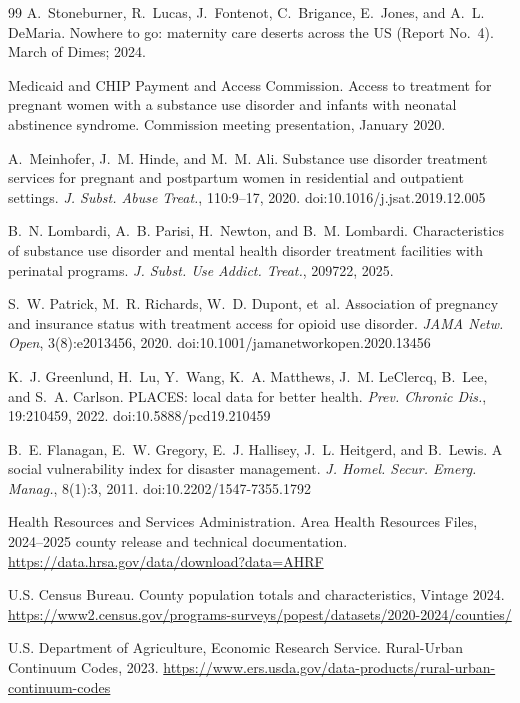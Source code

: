 \documentclass[10pt,twocolumn,letterpaper]{article}
\begin{document}
\begin{thebibliography}{99}
 A.~Stoneburner, R.~Lucas, J.~Fontenot, C.~Brigance, E.~Jones, and A.~L. DeMaria. Nowhere to go: maternity care deserts across the US (Report No.~4). March of Dimes; 2024.

 Medicaid and CHIP Payment and Access Commission. Access to treatment for pregnant women with a substance use disorder and infants with neonatal abstinence syndrome. Commission meeting presentation, January 2020.

 A.~Meinhofer, J.~M. Hinde, and M.~M. Ali. Substance use disorder treatment services for pregnant and postpartum women in residential and outpatient settings. \emph{J. Subst. Abuse Treat.}, 110:9--17, 2020. doi:10.1016/j.jsat.2019.12.005

 B.~N. Lombardi, A.~B. Parisi, H.~Newton, and B.~M. Lombardi. Characteristics of substance use disorder and mental health disorder treatment facilities with perinatal programs. \emph{J. Subst. Use Addict. Treat.}, 209722, 2025.

 S.~W. Patrick, M.~R. Richards, W.~D. Dupont, et~al. Association of pregnancy and insurance status with treatment access for opioid use disorder. \emph{JAMA Netw. Open}, 3(8):e2013456, 2020. doi:10.1001/jamanetworkopen.2020.13456

 K.~J. Greenlund, H.~Lu, Y.~Wang, K.~A. Matthews, J.~M. LeClercq, B.~Lee, and S.~A. Carlson. PLACES: local data for better health. \emph{Prev. Chronic Dis.}, 19:210459, 2022. doi:10.5888/pcd19.210459

 B.~E. Flanagan, E.~W. Gregory, E.~J. Hallisey, J.~L. Heitgerd, and B.~Lewis. A social vulnerability index for disaster management. \emph{J. Homel. Secur. Emerg. Manag.}, 8(1):3, 2011. doi:10.2202/1547-7355.1792

 Health Resources and Services Administration. Area Health Resources Files, 2024--2025 county release and technical documentation. \url{https://data.hrsa.gov/data/download?data=AHRF}

 U.S. Census Bureau. County population totals and characteristics, Vintage 2024. \url{https://www2.census.gov/programs-surveys/popest/datasets/2020-2024/counties/}

 U.S. Department of Agriculture, Economic Research Service. Rural-Urban Continuum Codes, 2023. \url{https://www.ers.usda.gov/data-products/rural-urban-continuum-codes}


\end{thebibliography}
\end{document}
